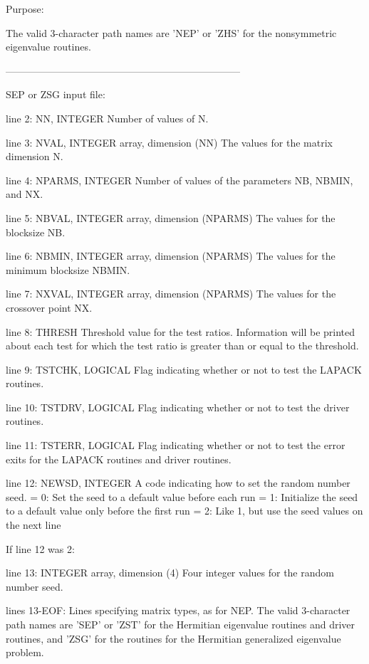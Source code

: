 \begin{DoxyParagraph}{Purpose\+: }
\begin{DoxyVerb}
          The valid 3-character path names are 'NEP' or 'ZHS' for the
          nonsymmetric eigenvalue routines.

-----------------------------------------------------------------------

 SEP or ZSG input file:

 line 2:  NN, INTEGER
          Number of values of N.

 line 3:  NVAL, INTEGER array, dimension (NN)
          The values for the matrix dimension N.

 line 4:  NPARMS, INTEGER
          Number of values of the parameters NB, NBMIN, and NX.

 line 5:  NBVAL, INTEGER array, dimension (NPARMS)
          The values for the blocksize NB.

 line 6:  NBMIN, INTEGER array, dimension (NPARMS)
          The values for the minimum blocksize NBMIN.

 line 7:  NXVAL, INTEGER array, dimension (NPARMS)
          The values for the crossover point NX.

 line 8:  THRESH
          Threshold value for the test ratios.  Information will be
          printed about each test for which the test ratio is greater
          than or equal to the threshold.

 line 9:  TSTCHK, LOGICAL
          Flag indicating whether or not to test the LAPACK routines.

 line 10: TSTDRV, LOGICAL
          Flag indicating whether or not to test the driver routines.

 line 11: TSTERR, LOGICAL
          Flag indicating whether or not to test the error exits for
          the LAPACK routines and driver routines.

 line 12: NEWSD, INTEGER
          A code indicating how to set the random number seed.
          = 0:  Set the seed to a default value before each run
          = 1:  Initialize the seed to a default value only before the
                first run
          = 2:  Like 1, but use the seed values on the next line

 If line 12 was 2:

 line 13: INTEGER array, dimension (4)
          Four integer values for the random number seed.

 lines 13-EOF:  Lines specifying matrix types, as for NEP.
          The valid 3-character path names are 'SEP' or 'ZST' for the
          Hermitian eigenvalue routines and driver routines, and
          'ZSG' for the routines for the Hermitian generalized
          eigenvalue problem.


\end{DoxyVerb}
\end{DoxyParagraph}
